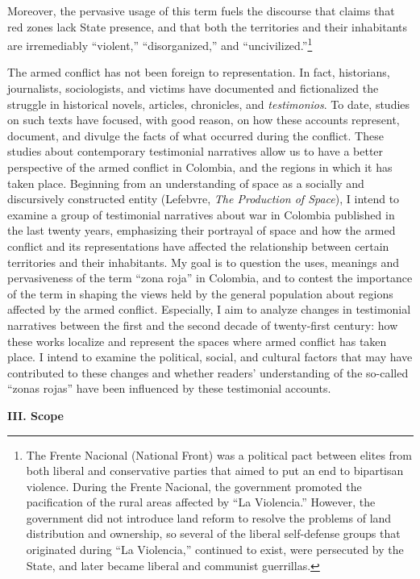 \documentclass[
  11pt,
,
onecolumn,
openany
]{book}
\begin{document}
Moreover, the pervasive usage of this term fuels the discourse that claims
that red zones lack State presence, and that both the territories and their
inhabitants are irremediably ``violent,'' ``disorganized,'' and
``uncivilized.''\footnote{The Frente Nacional (National Front) was a political
  pact between elites from both liberal and conservative parties that aimed to
  put an end to bipartisan violence. During the Frente Nacional, the
  government promoted the pacification of the rural areas affected by ``La
  Violencia.'' However, the government did not introduce land reform to
  resolve the problems of land distribution and ownership, so several of the
  liberal self-defense groups that originated during ``La Violencia,''
  continued to exist, were persecuted by the State, and later became liberal
  and communist guerrillas.}

The armed conflict has not been foreign to representation. In fact,
historians, journalists, sociologists, and victims have documented and
fictionalized the struggle in historical novels, articles, chronicles, and
\emph{testimonios}. To date, studies on such texts have focused, with good
reason, on how these accounts represent, document, and divulge the facts of
what occurred during the conflict. These studies about contemporary
testimonial narratives allow us to have a better perspective of the armed
conflict in Colombia, and the regions in which it has taken place. Beginning
from an understanding of space as a socially and discursively constructed
entity (Lefebvre, \emph{The Production of Space}), I intend to examine a group
of testimonial narratives about war in Colombia published in the last twenty
years, emphasizing their portrayal of space and how the armed conflict and its
representations have affected the relationship between certain territories and
their inhabitants. My goal is to question the uses, meanings and pervasiveness
of the term ``zona roja'' in Colombia, and to contest the importance of the
term in shaping the views held by the general population about regions
affected by the armed conflict. Especially, I aim to analyze changes in
testimonial narratives between the first and the second decade of twenty-first
century: how these works localize and represent the spaces where armed
conflict has taken place. I intend to examine the political, social, and
cultural factors that may have contributed to these changes and whether
readers' understanding of the so-called ``zonas rojas'' have been influenced
by these testimonial accounts.

\textbf{III. Scope}
\end{document}
